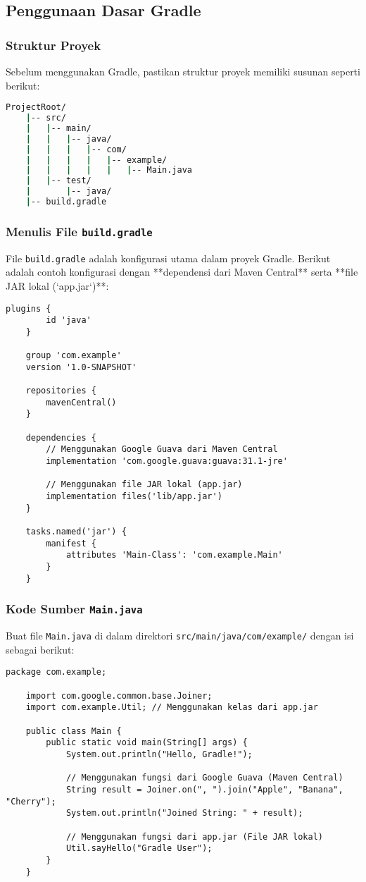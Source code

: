 \subsection{Penggunaan Dasar Gradle}
\subsubsection{Struktur Proyek}
Sebelum menggunakan Gradle, pastikan struktur proyek memiliki susunan seperti berikut:

\begin{lstlisting}[language=bash]
	ProjectRoot/
	|-- src/
	|   |-- main/
	|   |   |-- java/
	|   |   |   |-- com/
	|   |   |   |   |-- example/
	|   |   |   |   |   |-- Main.java
	|   |-- test/
	|       |-- java/
	|-- build.gradle
\end{lstlisting}

\subsubsection{Menulis File \texttt{build.gradle}}
File \texttt{build.gradle} adalah konfigurasi utama dalam proyek Gradle. Berikut adalah contoh konfigurasi dengan **dependensi dari Maven Central** serta **file JAR lokal (`app.jar`)**:

\begin{lstlisting}[style=XmlStyle]
	plugins {
		id 'java'
	}
	
	group 'com.example'
	version '1.0-SNAPSHOT'
	
	repositories {
		mavenCentral()
	}
	
	dependencies {
		// Menggunakan Google Guava dari Maven Central
		implementation 'com.google.guava:guava:31.1-jre'
		
		// Menggunakan file JAR lokal (app.jar)
		implementation files('lib/app.jar')
	}
	
	tasks.named('jar') {
		manifest {
			attributes 'Main-Class': 'com.example.Main'
		}
	}
\end{lstlisting}

\subsubsection{Kode Sumber \texttt{Main.java}}
Buat file \texttt{Main.java} di dalam direktori \texttt{src/main/java/com/example/} dengan isi sebagai berikut:

\begin{lstlisting}[style=JavaStyle]
	package com.example;
	
	import com.google.common.base.Joiner;
	import com.example.Util; // Menggunakan kelas dari app.jar
	
	public class Main {
		public static void main(String[] args) {
			System.out.println("Hello, Gradle!");
			
			// Menggunakan fungsi dari Google Guava (Maven Central)
			String result = Joiner.on(", ").join("Apple", "Banana", "Cherry");
			System.out.println("Joined String: " + result);
			
			// Menggunakan fungsi dari app.jar (File JAR lokal)
			Util.sayHello("Gradle User");
		}
	}
\end{lstlisting}

